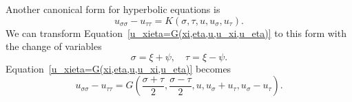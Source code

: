Another canonical form for  hyperbolic equations is
\begin{equation}
  \label{u_sigmasigma-u_tautau=K(sigma,tau,u,u_sigma,u_tau)}
  u_{\sigma \sigma} - u_{\tau \tau} = K(\sigma, \tau, u, u_\sigma, u_\tau).
\end{equation}
We can transform Equation~\ref{u_xieta=G(xi,eta,u,u_xi,u_eta)} 
to this form with the change of variables
\[
\sigma = \xi + \psi, \quad \tau = \xi - \psi.
\]
Equation~\ref{u_xieta=G(xi,eta,u,u_xi,u_eta)} becomes
\[
u_{\sigma \sigma} - u_{\tau \tau} 
= G \left( \frac{\sigma + \tau}{2}, \frac{\sigma - \tau}{2}, u, u_\sigma + u_\tau, u_\sigma - u_\tau \right).
\]











